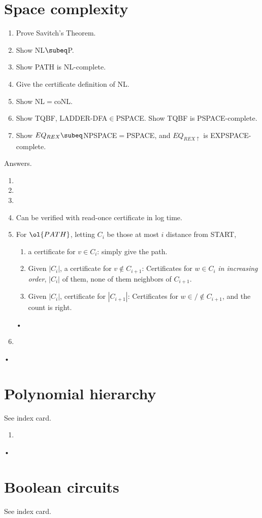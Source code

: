 \section{Space complexity}
\begin{enumerate}
\item
Prove Savitch's Theorem.
\item
Show NL$\subeq$P.
\item
Show PATH is NL-complete.
\item 
Give the certificate definition of NL.
\item
Show NL$=$coNL.
\item
Show TQBF, LADDER-DFA$\in$PSPACE. Show TQBF is PSPACE-complete.
\item Show $EQ_{REX}\subeq$NPSPACE$=$PSPACE, and $EQ_{REX\uparrow}$ is EXPSPACE-complete.
\end{enumerate}
Answers.
\begin{enumerate}
\item
\item
\item
\item Can be verified with read-once certificate in log time.
\item For $\ol{PATH}$, letting $C_i$ be those at most $i$ distance from START,
\begin{enumerate}
\item a certificate for $v\in C_i$: simply give the path.
\item
Given $|C_i|$, a certificate for $v\nin C_{i+1}$: Certificates for $w\in C_i$ {\it in increasing order}, $|C_i|$ of them, none of them neighbors of $C_{i+1}$.
\item
Given $|C_i|$, certificate for $|C_{i+1}|$: Certificates for $w\in/\nin C_{i+1}$, and the count is right.
\end{enumerate}•
\item

\end{enumerate}•
\section{Polynomial hierarchy}
See index card.


\begin{enumerate}
\item

\end{enumerate}•
\section{Boolean circuits}
See index card. 

